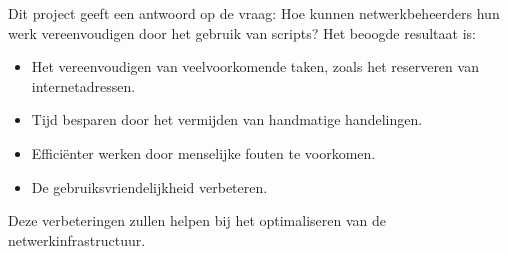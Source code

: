 \documentclass{hogent-article}
\begin{document}
Dit project geeft een antwoord op de vraag: Hoe kunnen netwerkbeheerders hun werk vereenvoudigen door het gebruik van scripts?
Het beoogde resultaat is:
\begin{itemize}
    \item Het vereenvoudigen van veelvoorkomende taken, zoals het reserveren van internetadressen.
    \item Tijd besparen door het vermijden van handmatige handelingen.
    \item Efficiënter werken door menselijke fouten te voorkomen.
    \item De gebruiksvriendelijkheid verbeteren.
\end{itemize}

Deze verbeteringen zullen helpen bij het optimaliseren van de netwerkinfrastructuur.




\end{document}

